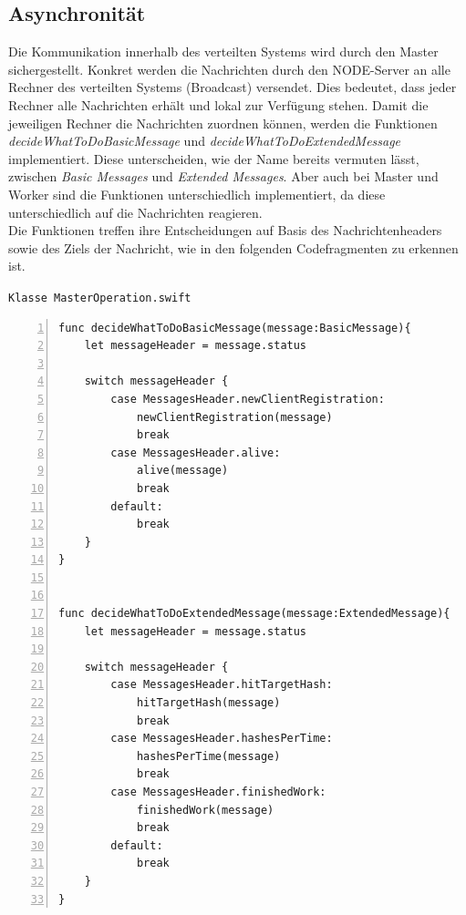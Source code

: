 \subsection{Asynchronität}
Die Kommunikation innerhalb des verteilten Systems wird durch den Master sichergestellt. Konkret werden die Nachrichten durch den NODE-Server an alle Rechner des verteilten Systems (Broadcast) versendet. Dies bedeutet, dass jeder Rechner alle Nachrichten erhält und lokal zur Verfügung stehen. Damit die jeweiligen Rechner die Nachrichten zuordnen können, werden die Funktionen \emph{decideWhatToDoBasicMessage} und \emph{decideWhatToDoExtendedMessage} implementiert. Diese unterscheiden, wie der Name bereits vermuten lässt, zwischen \emph{Basic Messages} und \emph{Extended Messages}. Aber auch bei Master und Worker sind die Funktionen unterschiedlich implementiert, da diese unterschiedlich auf die Nachrichten reagieren. \\
Die Funktionen treffen ihre Entscheidungen auf Basis des Nachrichtenheaders sowie des Ziels der Nachricht, wie in den folgenden Codefragmenten zu erkennen ist. 
\newpage

\texttt{Klasse MasterOperation.swift}
\begin{lstlisting}[basicstyle=\ttfamily,numbers=left,numberstyle=\footnotesize\ttfamily,backgroundcolor=\color{sourcegray}]
func decideWhatToDoBasicMessage(message:BasicMessage){
	let messageHeader = message.status
        
    switch messageHeader {
        case MessagesHeader.newClientRegistration:
            newClientRegistration(message)
            break
        case MessagesHeader.alive:
            alive(message)
            break
        default:
            break
    }
}


func decideWhatToDoExtendedMessage(message:ExtendedMessage){
    let messageHeader = message.status
        
    switch messageHeader {
        case MessagesHeader.hitTargetHash:
            hitTargetHash(message)
            break
        case MessagesHeader.hashesPerTime:
            hashesPerTime(message)
            break
        case MessagesHeader.finishedWork:
            finishedWork(message)
            break
        default:
            break
    }
}
\end{lstlisting}

\newpage

